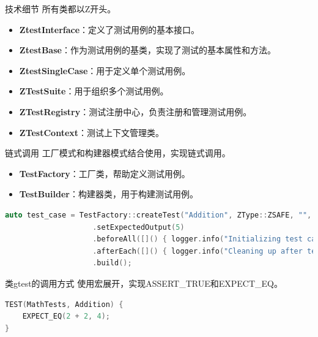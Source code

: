 \documentclass{beamer}
\begin{document}
\begin{frame}{技术细节}
    所有类都以Z开头。
    \begin{itemize}
        \item \textbf{ZtestInterface}：定义了测试用例的基本接口。
        \item \textbf{ZtestBase}：作为测试用例的基类，实现了测试的基本属性和方法。
        \item \textbf{ZtestSingleCase}：用于定义单个测试用例。
        \item \textbf{ZTestSuite}：用于组织多个测试用例。
        \item \textbf{ZTestRegistry}：测试注册中心，负责注册和管理测试用例。
        \item \textbf{ZTestContext}：测试上下文管理类。
    \end{itemize}
\end{frame}
\begin{frame}[fragile]{链式调用}
    工厂模式和构建器模式结合使用，实现链式调用。
    \begin{itemize}
        \item \textbf{TestFactory}：工厂类，帮助定义测试用例。
        \item \textbf{TestBuilder}：构建器类，用于构建测试用例。
    \end{itemize}
    \begin{lstlisting}[language=C++]
auto test_case = TestFactory::createTest("Addition", ZType::ZSAFE, "", add, 2, 3)
                    .setExpectedOutput(5)
                    .beforeAll([]() { logger.info("Initializing test case resources...\n"); })
                    .afterEach([]() { logger.info("Cleaning up after test...\n"); })
                    .build();
    \end{lstlisting}
\end{frame}
\begin{frame}[fragile]{类gtest的调用方式}
    使用宏展开，实现ASSERT\_TRUE和EXPECT\_EQ。
    \begin{lstlisting}[language=C++]
TEST(MathTests, Addition) {
    EXPECT_EQ(2 + 2, 4);
}
    \end{lstlisting}
\end{frame}
\end{document}
